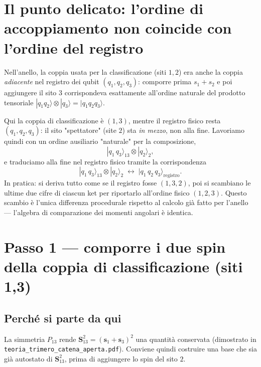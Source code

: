 \documentclass[11pt,a4paper]{article}
\begin{document}
\section{Il punto delicato: l'ordine di accoppiamento non coincide con l'ordine del registro}
\label{sec:riordino}

Nell'anello, la coppia usata per la classificazione (siti $1,2$) era anche
la coppia \emph{adiacente} nel registro dei qubit $(q_1,q_2,q_3)$: comporre
prima $s_1+s_2$ e poi aggiungere il sito $3$ corrispondeva esattamente
all'ordine naturale del prodotto tensoriale $|q_1q_2\rangle\otimes|q_3\rangle=|q_1q_2q_3\rangle$.

Qui la coppia di classificazione è $(1,3)$, mentre il registro fisico resta
$(q_1,q_2,q_3)$: il sito "spettatore" (site $2$) sta \emph{in mezzo}, non
alla fine. Lavoriamo quindi con un ordine ausiliario "naturale" per la
composizione,
\begin{equation}
|q_1\,q_3\rangle_{13}\otimes|q_2\rangle_2 ,
\end{equation}
e traduciamo alla fine nel registro fisico tramite la corrispondenza
\begin{equation}
|q_1\,q_3\rangle_{13}\otimes|q_2\rangle_2 \;\longleftrightarrow\; |q_1\,q_2\,q_3\rangle_{\text{registro}} .
\label{eq:riordino}
\end{equation}
In pratica: si deriva tutto come se il registro fosse $(1,3,2)$, poi si
scambiano le ultime due cifre di ciascun ket per riportarlo all'ordine
fisico $(1,2,3)$. Questo scambio è l'unica differenza procedurale rispetto
al calcolo già fatto per l'anello — l'algebra di comparazione dei momenti
angolari è identica.

\section{Passo 1 — comporre i due spin della coppia di classificazione (siti 1,3)}

\subsection{Perché si parte da qui}

La simmetria $P_{13}$ rende $\mathbf S_{13}^2=(\mathbf s_1+\mathbf s_3)^2$ una
quantità conservata (dimostrato in \texttt{teoria\_\allowbreak trimero\_\allowbreak catena\_\allowbreak aperta.pdf}).
Conviene quindi costruire una base che sia già autostato di
$\mathbf S_{13}^2$, prima di aggiungere lo spin del sito $2$.
\end{document}
